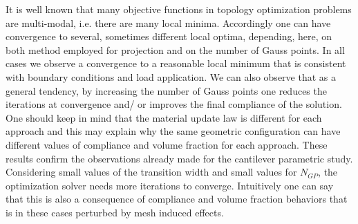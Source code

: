 It is well known that many objective functions in topology optimization problems are multi-modal, i.e. there are many local minima. Accordingly one can have convergence to several, sometimes different local optima, depending, here, on both method employed for projection and on the number of Gauss points.
 In all cases we observe a convergence to a reasonable local minimum that is consistent with boundary conditions and load application. We can also observe that as a general tendency, by increasing the number of Gauss points one reduces the iterations at convergence and/ or improves the final compliance of the solution. One should keep in mind that the material update law is different for each approach and this may explain why the same geometric configuration can have different values of compliance and volume fraction for each approach. These results confirm the observations already made for the cantilever parametric study. Considering small values of the transition width and small values for $N_{GP}$, the optimization solver needs more iterations to converge. Intuitively one can say that this is also a consequence of compliance and volume fraction behaviors that is in these cases perturbed by mesh induced effects.
